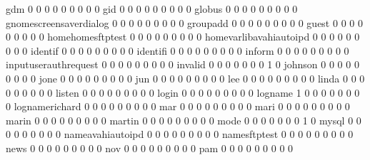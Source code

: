 \documentclass[compress,8pt]{beamer}
\begin{document}
\begin{frame}
\begin{Schunk}
  gdm                                        0   0   0   0   0   0   0   0   0
  gid                                        0   0   0   0   0   0   0   0   0
  globus                                     0   0   0   0   0   0   0   0   0
  gnomescreensaverdialog                     0   0   0   0   0   0   0   0   0
  groupadd                                   0   0   0   0   0   0   0   0   0
  guest                                      0   0   0   0   0   0   0   0   0
  homehomesftptest                           0   0   0   0   0   0   0   0   0
  homevarlibavahiautoipd                     0   0   0   0   0   0   0   0   0
  identif                                    0   0   0   0   0   0   0   0   0
  identifi                                   0   0   0   0   0   0   0   0   0
  inform                                     0   0   0   0   0   0   0   0   0
  inputuserauthrequest                       0   0   0   0   0   0   0   0   0
  invalid                                    0   0   0   0   0   0   0   1   0
  johnson                                    0   0   0   0   0   0   0   0   0
  jone                                       0   0   0   0   0   0   0   0   0
  jun                                        0   0   0   0   0   0   0   0   0
  lee                                        0   0   0   0   0   0   0   0   0
  linda                                      0   0   0   0   0   0   0   0   0
  listen                                     0   0   0   0   0   0   0   0   0
  login                                      0   0   0   0   0   0   0   0   0
  logname                                    1   0   0   0   0   0   0   0   0
  lognamerichard                             0   0   0   0   0   0   0   0   0
  mar                                        0   0   0   0   0   0   0   0   0
  mari                                       0   0   0   0   0   0   0   0   0
  marin                                      0   0   0   0   0   0   0   0   0
  martin                                     0   0   0   0   0   0   0   0   0
  mode                                       0   0   0   0   0   0   0   1   0
  mysql                                      0   0   0   0   0   0   0   0   0
  nameavahiautoipd                           0   0   0   0   0   0   0   0   0
  namesftptest                               0   0   0   0   0   0   0   0   0
  news                                       0   0   0   0   0   0   0   0   0
  nov                                        0   0   0   0   0   0   0   0   0
  pam                                        0   0   0   0   0   0   0   0   0

\end{Schunk}
\end{frame}
\end{document}
